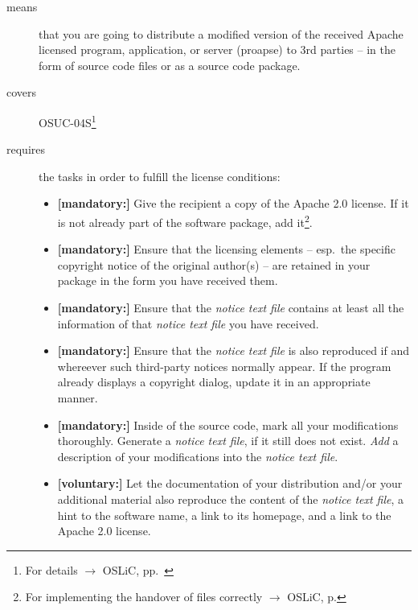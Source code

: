 \begin{description}
\item[means] that you are going to distribute a modified version of the received
Apache licensed program, application, or server (proapse) to 3rd parties -- in
the form of source code files or as a source code package.
\item[covers] OSUC-04S\footnote{For details $\rightarrow$ OSLiC, pp.\
\pageref{OSUC-04S-DEF}}
\item[requires] the tasks in order to fulfill the license conditions:
\begin{itemize}
  
  \item \textbf{[mandatory:]} Give the recipient a copy of the Apache 2.0
  license. If it is not already part of the software package, add
  it\footnote{For implementing the handover of files correctly $\rightarrow$
  OSLiC, p. \pageref{DistributingFilesHint}}.

  \item \textbf{[mandatory:]} Ensure that the licensing elements -- esp.\ the
  specific copyright notice of the original author(s) -- are retained in your
  package in the form you have received them.
  
  \item \textbf{[mandatory:]} Ensure that the \emph{notice text file} contains
  at least all the information of that \emph{notice text file} you have
  received.

  \item \textbf{[mandatory:]} Ensure that the \emph{notice text file} is also
  reproduced if and whereever such third-party notices normally appear. If the
  program already displays a copyright dialog, update it in an appropriate
  manner.
  
  \item \textbf{[mandatory:]} Inside of the source code, mark all your
  modifications thoroughly. Generate a \emph{notice text file}, if it still does
  not exist. \emph{Add} a description of your modifications into the
  \emph{notice text file}.
   
  \item \textbf{[voluntary:]} Let the documentation of your distribution and/or
  your additional material also reproduce the content of the \emph{notice text
  file}, a hint to the software name, a link to its homepage, and a link to the
  Apache 2.0 license.
  
 \end{itemize}
 

\end{description}
